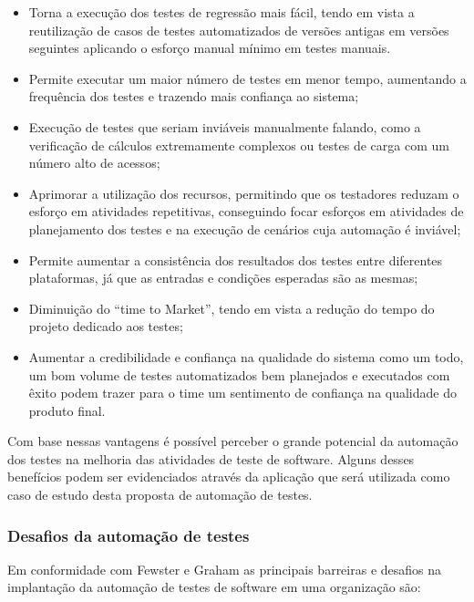 \begin{itemize}
	\item Torna a execução dos testes de regressão mais fácil, tendo em vista a reutilização de casos de testes automatizados de versões antigas em versões seguintes aplicando o esforço manual mínimo em testes manuais.
	\item Permite executar um maior número de testes em menor tempo, aumentando a frequência dos testes e trazendo mais confiança ao sistema;
	\item Execução de testes que seriam inviáveis manualmente falando, como a verificação de cálculos extremamente complexos ou testes de carga com um número alto de acessos;
	\item Aprimorar a utilização dos recursos, permitindo que os testadores reduzam o esforço em atividades repetitivas, conseguindo focar esforços em atividades de planejamento dos testes e na execução de cenários cuja automação é inviável;
	\item Permite aumentar a consistência dos resultados dos testes entre diferentes plataformas, já que as entradas e condições esperadas são as mesmas;
	\item Diminuição do “time to Market”, tendo em vista a redução do tempo do projeto dedicado aos testes;
	\item Aumentar a credibilidade e confiança na qualidade do sistema como um todo, um bom volume de testes automatizados bem planejados e executados com êxito podem trazer para o time um sentimento de confiança na qualidade do produto final.
\end{itemize}

Com base nessas vantagens é possível perceber o grande potencial da automação dos testes na melhoria das atividades de teste de software. Alguns desses benefícios podem ser evidenciados através da aplicação que será utilizada como caso de estudo desta proposta de automação de testes.

\subsubsection{Desafios da automação de testes}

Em conformidade com Fewster e Graham \cite{Fewster1999} as principais barreiras e desafios na implantação da automação de testes de software em uma organização são:

